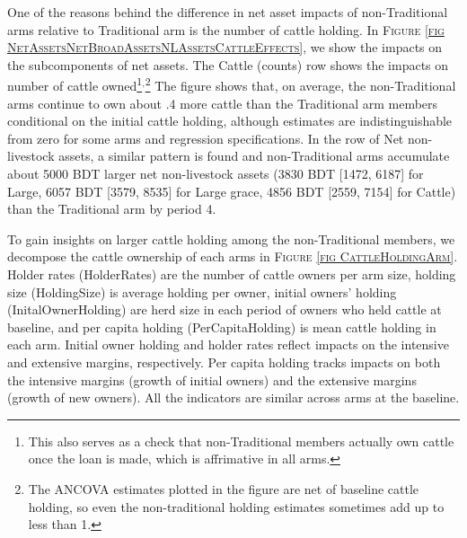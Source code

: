 	One of the reasons behind the difference in net asset impacts of non-\textsf{Traditional} arms relative to \textsf{Traditional} arm is the number of cattle holding. In \textsc{\footnotesize Figure \ref{fig NetAssetsNetBroadAssetsNLAssetsCattleEffects}}, we show the impacts on the subcomponents of net assets. The \textsf{Cattle (counts)} row shows the impacts on number of cattle owned\footnote{This also serves as a check that non-\textsf{Traditional} members actually own cattle once the loan is made, which is affrimative in all arms. }$^{,}$\footnote{The ANCOVA estimates plotted in the figure are net of baseline cattle holding, so even the non-traditional holding estimates sometimes add up to less than 1. }%
	The figure shows that, on average, the non-\textsf{Traditional} arms continue to own about .4 more cattle than the \textsf{Traditional} arm members conditional on the initial cattle holding, although estimates are indistinguishable from zero for some arms and regression specifications. In the row of \textsf{Net non-livestock assets}, a similar pattern is found and non-\textsf{Traditional} arms accumulate about 5000 BDT larger net non-livestock assets (3830 BDT [1472, 6187] for \textsf{Large}, 6057 BDT [3579, 8535] for \textsf{Large grace}, 4856 BDT [2559, 7154] for \textsf{Cattle}) than the \textsf{Traditional} arm by period 4. 

	To gain insights on larger cattle holding among the non-\textsf{Traditional} members, we decompose the cattle ownership of each arms in \textsc{\footnotesize Figure \ref{fig CattleHoldingArm}}. Holder rates (\textsf{HolderRates}) are the number of cattle owners per arm size, holding size (\textsf{HoldingSize}) is average holding per owner, initial owners' holding (\textsf{InitalOwnerHolding}) are herd size in each period of owners who held cattle at baseline, and per capita holding (\textsf{PerCapitaHolding}) is mean cattle holding in each arm. Initial owner holding and holder rates reflect impacts on the intensive and extensive margins, respectively. Per capita holding tracks impacts on both the intensive margins (growth of initial owners) and the extensive margins (growth of new owners). All the indicators are similar across arms at the baseline. 
	
